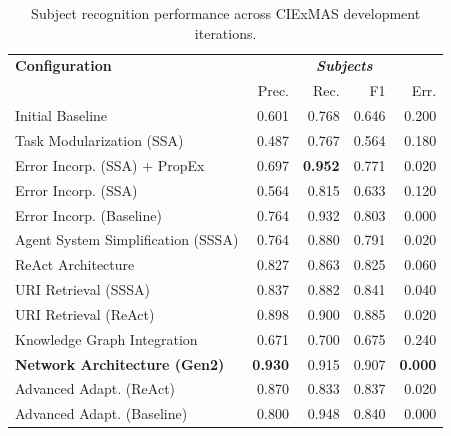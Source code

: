 \documentclass[a4paper,oneside,bibliography=totoc]{scrbook}
\begin{document}
\begin{table}[h]
  \centering
  \begin{tabular}{p{6cm}|rrrr}
    \toprule
    \textbf{Configuration}               & \multicolumn{4}{c}{\textit{\textbf{Subjects}}}                                           \\
                                         & Prec.                                          & Rec.           & F1    & Err.           \\
    \midrule
    Initial Baseline                     & 0.601                                          & 0.768          & 0.646 & 0.200          \\
    Task Modularization (SSA)            & 0.487                                          & 0.767          & 0.564 & 0.180          \\
    Error Incorp. (SSA) + PropEx         & 0.697                                          & \textbf{0.952} & 0.771 & 0.020          \\
    Error Incorp. (SSA)                  & 0.564                                          & 0.815          & 0.633 & 0.120          \\
    Error Incorp. (Baseline)             & 0.764                                          & 0.932          & 0.803 & 0.000          \\
    Agent System Simplification (SSSA)   & 0.764                                          & 0.880          & 0.791 & 0.020          \\
    ReAct Architecture                   & 0.827                                          & 0.863          & 0.825 & 0.060          \\
    \ac{URI} Retrieval (SSSA)            & 0.837                                          & 0.882          & 0.841 & 0.040          \\
    \ac{URI} Retrieval (ReAct)           & 0.898                                          & 0.900          & 0.885 & 0.020          \\
    Knowledge Graph Integration          & 0.671                                          & 0.700          & 0.675 & 0.240          \\
    \textbf{Network Architecture (Gen2)} & \textbf{0.930}                                 & 0.915          & 0.907 & \textbf{0.000} \\
    Advanced Adapt. (ReAct)              & 0.870                                          & 0.833          & 0.837 & 0.020          \\
    Advanced Adapt. (Baseline)           & 0.800                                          & 0.948          & 0.840 & 0.000          \\
    \bottomrule
  \end{tabular}
  \caption{Subject recognition performance across CIExMAS development iterations.}
  \label{tab:evaluation_subjects_iterations}
\end{table}
\end{document}
